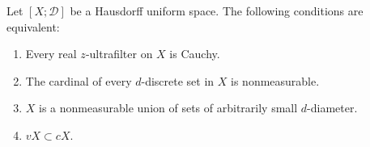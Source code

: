 Let $[X; \mathcal{D}]$ be a Hausdorff uniform space. The following conditions are equivalent:
\begin{enumerate}
\item[(1)] Every real $z$-ultrafilter on $X$ is Cauchy.
\item[(2)] The cardinal of every $d$-discrete set in $X$ is nonmeasurable.
\item[(3)] $X$ is a nonmeasurable union of sets of arbitrarily small $d$-diameter.
\item[(4)] $vX \subset cX$.
\end{enumerate}
